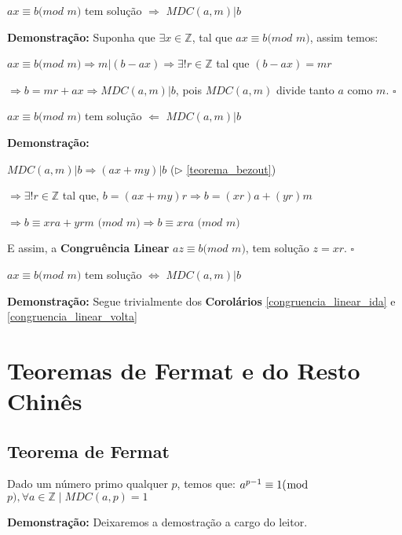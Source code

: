 \begin{corollary}\label{congruencia_linear_ida}
$ax \equiv b (mod$ $m)$ tem solução $\Rightarrow$ $MDC(a,m)|b$
\end{corollary}
\textbf{Demonstração:}
Suponha que $\exists x\in\mathbb{Z}$, tal que $ax\equiv b(mod$ $m)$, assim temos:

$ax\equiv b(mod$ $m) \Rightarrow m|(b-ax) \Rightarrow \exists! r\in\mathbb{Z}$ tal que $(b-ax) = mr$

$\Rightarrow b = mr + ax \Rightarrow MDC(a,m)|b$, pois $MDC(a,m)$ divide tanto $a$ como $m$. $\square$



\begin{corollary}\label{congruencia_linear_volta}
$ax \equiv b (mod$ $m)$ tem solução $\Leftarrow$ $MDC(a,m)|b$
\end{corollary}
\textbf{Demonstração:}

$MDC(a,m)|b \Rightarrow (ax+my)|b$ ($\triangleright$ \autoref{teorema_bezout})

$\Rightarrow \exists!r\in\mathbb{Z}$ tal que, $b=(ax + my)r \Rightarrow b = (xr)a + (yr)m$

$\Rightarrow b \equiv xra + yrm$ $(mod$ $m) \Rightarrow b \equiv xra$ $(mod$ $m)$

E assim, a \textbf{Congruência Linear} $az\equiv b (mod$ $m)$, tem solução $z=xr$. $\square$

\begin{theorem}
$ax \equiv b (mod$ $m)$ tem solução $\Leftrightarrow$ $MDC(a,m)|b$
\end{theorem}
\textbf{Demonstração:}
Segue trivialmente dos \textbf{Corolários} \autoref{congruencia_linear_ida} e \autoref{congruencia_linear_volta}


\section{Teoremas de Fermat e do Resto Chinês}

\subsection{Teorema de Fermat}

\begin{theorem}\label{teorema_fermat}
Dado um número primo qualquer $p$, temos que: 
$a^{p-1} \equiv 1 (\bmod$ $p), \forall a \in \mathbb{Z} \mid MDC(a, p) = 1$
\end{theorem}
\textbf{Demonstração:}
Deixaremos a demostração a cargo do leitor.


